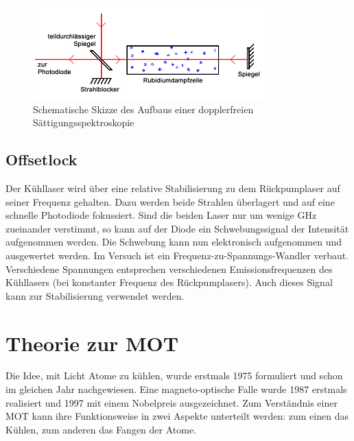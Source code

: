 \documentclass[
class=book,
accentcolor=1b,
custommargins=geometry,
fontsize=11pt,
thesis={type=Versuchsanleitung},
ruledheaders=all,
headline=false,
instbox=false,
marginpar=false,
title=small,
ignore-missing-data=true,
twoside=false,
logofile=apqdesign/tuda_logo.pdf,
pdfa=false %
]{apqpub}
\begin{document}
				\begin{figure}[htb!]
					\centering
					\includegraphics[width=0.8\textwidth]{graphics/DSS.jpg}
					\caption{Schematische Skizze des Aufbaus einer dopplerfreien Sättigungsspektroskopie}
					\label{fig:DSS}
				\end{figure}
				
				\section{Offsetlock}\label{ssec:Offsetlock}			
				Der Kühllaser wird über eine relative Stabilisierung zu dem Rückpumplaser auf seiner Frequenz gehalten. Dazu werden beide Strahlen überlagert und auf eine schnelle Photodiode fokussiert. Sind die beiden Laser nur um wenige GHz zueinander verstimmt, so kann auf der Diode ein Schwebungssignal der Intensität aufgenommen werden. Die Schwebung kann nun elektronisch aufgenommen und ausgewertet werden.
				Im Versuch ist ein Frequenz-zu-Spannungs-Wandler verbaut. Verschiedene Spannungen entsprechen verschiedenen Emissionsfrequenzen des Kühllasers (bei konstanter Frequenz des Rückpumplasers). Auch dieses Signal kann zur Stabilisierung verwendet werden.				
				
				\chapter{Theorie zur MOT}	
				Die Idee, mit Licht Atome zu kühlen, wurde erstmals 1975 formuliert und schon im gleichen Jahr nachgewiesen.
				Eine magneto-optische Falle wurde 1987 erstmals realisiert und 1997 mit einem Nobelpreis ausgezeichnet. Zum
				Verständnis einer MOT kann ihre Funktionsweise in zwei Aspekte unterteilt werden: zum einen das Kühlen, zum
				anderen das Fangen der Atome.
				
\end{document}
